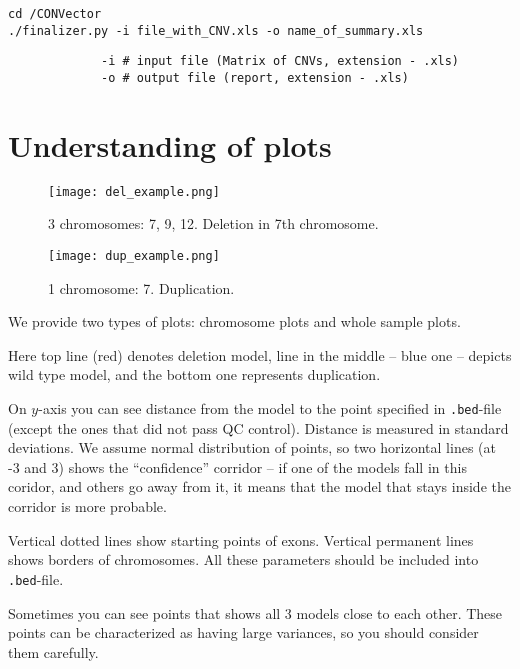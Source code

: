 \documentclass{article}
\begin{document}
\begin{lstlisting}[style=DOS, caption={Launch of Finalizer}]
cd /CONVector
./finalizer.py -i file_with_CNV.xls -o name_of_summary.xls
\end{lstlisting}


\begin{verbatim}
             -i # input file (Matrix of CNVs, extension - .xls)
             -o # output file (report, extension - .xls)
\end{verbatim}


\newpage
\section{Understanding of plots}

\begin{figure}[h]
\begin{center}
\begin{minipage}[h]{0.48\linewidth}
\texttt{[image: del\_example.png]}
\caption{3 chromosomes: 7, 9, 12. Deletion in 7th chromosome.} 
\label{ris:del_ex} 
\end{minipage}
\hfill 
\begin{minipage}[h]{0.48\linewidth}
\texttt{[image: dup\_example.png]}
\caption{1 chromosome: 7. Duplication.}
\label{ris:dup_ex}
\end{minipage}
\end{center}
\end{figure}

We provide two types of plots: chromosome plots and whole sample plots.

Here top line (red) denotes deletion model, line in the middle -- blue one -- depicts wild type model, and the bottom one represents duplication.

On $y$-axis you can see distance from the model to the point specified in \texttt{.bed}-file (except the ones that did not pass QC control). Distance is measured in standard deviations. We assume normal distribution of points, so two horizontal lines (at -3 and 3) shows the ``confidence'' corridor -- if one of the models fall in this coridor, and others go away from it, it means that the model that stays inside the corridor is more probable.

Vertical dotted lines show starting points of exons. Vertical permanent lines shows borders of chromosomes. All these parameters should be included into \texttt{.bed}-file.

Sometimes you can see points that shows all 3 models close to each other. These points can be characterized as having large variances, so you should consider them carefully.
\end{document}
